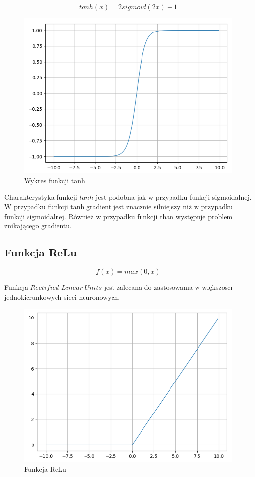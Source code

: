 \begin{equation}
tanh(x) = 2sigmoid(2x) - 1
\end{equation}

\begin{figure}[H]
	\centering
	\includegraphics[width=0.5\linewidth]{tanh}
	\caption{Wykres funkcji tanh}
	\label{fig:tanh}
\end{figure}

Charakterystyka funkcji $tanh$ jest podobna jak w przypadku funkcji sigmoidalnej. W przypadku funkcji tanh gradient jest znacznie silniejszy niż w przypadku funkcji sigmoidalnej. Również w przypadku funkcji than występuje problem znikającego gradientu. 

\subsection{Funkcja ReLu}

\begin{equation}
	f(x) = max(0, x)
\end{equation}

Funkcja $\textit{Rectified Linear Units}$ jest zalecana do zastosowania w większości jednokierunkowych sieci neuronowych.

\begin{figure}[H]
	\centering
	\includegraphics[width=0.5\linewidth]{relu}
	\caption{Funkcja ReLu}
	\label{fig:relu}
\end{figure}

